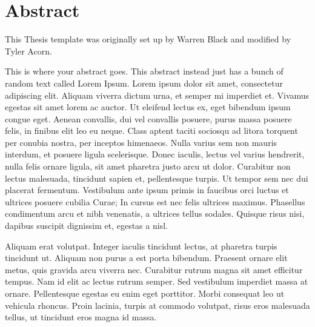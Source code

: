
\chapter*{Abstract}
\begin{DoubleSpace}
This Thesis template was originally set up by Warren Black and modified by Tyler Acorn.

This is where your abstract goes. This abstract instead just has a bunch of random text called Lorem Ipsum. Lorem ipsum dolor sit amet, consectetur adipiscing elit. Aliquam viverra dictum urna, et semper mi imperdiet et. Vivamus egestas sit amet lorem ac auctor. Ut eleifend lectus ex, eget bibendum ipsum congue eget. Aenean convallis, dui vel convallis posuere, purus massa posuere felis, in finibus elit leo eu neque. Class aptent taciti sociosqu ad litora torquent per conubia nostra, per inceptos himenaeos. Nulla varius sem non mauris interdum, et posuere ligula scelerisque. Donec iaculis, lectus vel varius hendrerit, nulla felis ornare ligula, sit amet pharetra justo arcu ut dolor. Curabitur non lectus malesuada, tincidunt sapien et, pellentesque turpis. Ut tempor sem nec dui placerat fermentum. Vestibulum ante ipsum primis in faucibus orci luctus et ultrices posuere cubilia Curae; In cursus est nec felis ultrices maximus. Phasellus condimentum arcu et nibh venenatis, a ultrices tellus sodales. Quisque risus nisi, dapibus suscipit dignissim et, egestas a nisl.

Aliquam erat volutpat. Integer iaculis tincidunt lectus, at pharetra turpis tincidunt ut. Aliquam non purus a est porta bibendum. Praesent ornare elit metus, quis gravida arcu viverra nec. Curabitur rutrum magna sit amet efficitur tempus. Nam id elit ac lectus rutrum semper. Sed vestibulum imperdiet massa at ornare. Pellentesque egestas eu enim eget porttitor. Morbi consequat leo ut vehicula rhoncus. Proin lacinia, turpis at commodo volutpat, risus eros malesuada tellus, ut tincidunt eros magna id massa.



\end{DoubleSpace}
